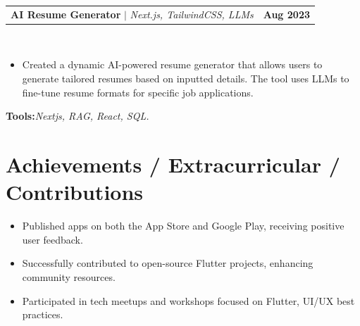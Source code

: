\documentclass[letterpaper,11pt]{article}
\makeatletter
\newcommand{\resumeItem}[1]{
  \item\small{
    {#1 \vspace{-2pt}}
  }
}
\newcommand{\resumeProjectHeading}[2]{
    \item
    \begin{tabular*}{1.001\textwidth}{l@{\extracolsep{\fill}}r}
      \small#1 & \textbf{\small #2}\\
    \end{tabular*}\vspace{-7pt}
}
\newcommand{\resumeItemListStart}{\begin{itemize}}
\newcommand{\resumeItemListEnd}{\end{itemize}\vspace{-5pt}}
\makeatother
\begin{document}
\resumeProjectHeading
{\textbf{AI Resume Generator} $|$ \emph{Next.js, TailwindCSS, LLMs}}{Aug 2023}\\
\resumeItemListStart
\vspace{4pt}
\resumeItem{Created a dynamic AI-powered resume generator that allows users to generate tailored resumes based on inputted details. The tool uses LLMs to fine-tune resume formats for specific job applications.}
\resumeItemListEnd
\vspace{4pt}
\textbf{Tools:}\emph{Nextjs, RAG, React, SQL.}
\vspace{-10pt}

\section{Achievements / Extracurricular / Contributions}
\begin{itemize}[leftmargin=0.15in, label={}]
\item Published apps on both the App Store and Google Play, receiving positive user feedback.
\item Successfully contributed to open-source Flutter projects, enhancing community resources.
\item Participated in tech meetups and workshops focused on Flutter, UI/UX best practices.
\end{itemize}
\end{document}
